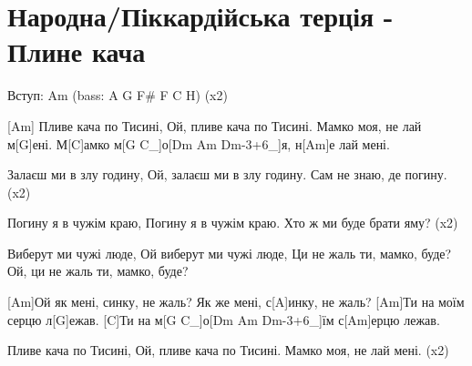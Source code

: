 \section{Народна/Піккардійська терція - Плине кача}
\begin{guitar}

Вступ: Am (bass: A G F\# F C H)  (x2)

[Am] Пливе кача по Тисині,
Ой, пливе кача по Тисині.
Мамко моя, не лай м[G]ені.
М[C]амко м[G C_]о[Dm Am Dm-3+6_]я, н[Am]е лай мені.

Залаєш ми в злу годину,
Ой, залаєш ми в злу годину.
Сам не знаю, де погину.   (x2)

Погину я в чужім краю,
Погину я в чужім краю.
Хто ж ми буде брати яму?  (x2)

Виберут ми чужі люде,
Ой виберут ми чужі люде,
Ци не жаль ти, мамко, буде?
Ой, ци не жаль ти, мамко, буде?

[Am]Ой як мені, синку, не жаль?
Як же мені, с[A]инку, не жаль?
[Am]Ти на моїм серцю л[G]ежав.
[C]Ти на м[G C_]о[Dm Am Dm-3+6_]їм с[Am]ерцю лежав.

Пливе кача по Тисині,
Ой, пливе кача по Тисині.
Мамко моя, не лай мені.   (x2)
\end{guitar}
